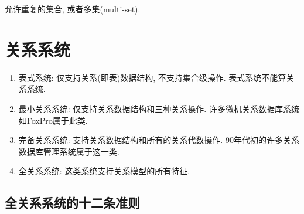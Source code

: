 \begin{definition}[包(Bag)]
    允许重复的集合, 或者多集(multi-set).
\end{definition}

\section{关系系统}

\begin{enumerate}
    \item 表式系统: 仅支持关系(即表)数据结构, 不支持集合级操作. 表式系统不能算关系系统.
    \item 最小关系系统: 仅支持关系数据结构和三种关系搡作. 许多微机关系数据库系统如FoxPro属于此类.
    \item 完备关系系统: 支持关系数据结构和所有的关系代数操作. 90年代初的许多关系数据库管理系统属于这一类.
    \item 全关系系统: 这类系统支持关系模型的所有特征.
\end{enumerate}

\subsection{全关系系统的十二条准则}

